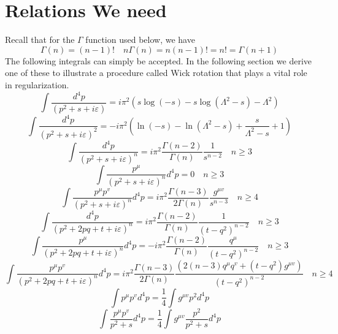 \section{Relations We need}
Recall that for the $\Gamma$ function used below, we have
$$\Gamma(n)=(n-1) !\quad n \Gamma(n)=n(n-1) !=n !=\Gamma(n+1)$$
The following integrals can simply be accepted. In the following section we derive one of these to illustrate a procedure called Wick rotation that plays a vital role in regularization.
\begin{equation}
\int \frac{d^{4} p}{\left(p^{2}+s+i \varepsilon\right)}=i \pi^{2}\left(s\log(-s)-s\log \left(\Lambda^{2}-s\right)-\Lambda^{2}\right)
\label{inttb-1}
\end{equation}
\begin{equation}
\int \frac{d^{4} p}{\left(p^{2}+s+i \varepsilon\right)^{2}}=-i \pi^{2}\left(\ln (-s)-\ln \left(\Lambda^{2}-s\right)+\frac{s}{\Lambda^{2}-s}+1\right)
\label{wick-test-int}
\end{equation}
\begin{equation}
\int \frac{d^{4} p}{\left(p^{2}+s+i \varepsilon\right)^{n}}=i \pi^{2} \frac{\Gamma(n-2)}{\Gamma(n)} \frac{1}{s^{n-2}}\quad n\geq 3
\label{inttb-3}
\end{equation}
\begin{equation}
\int \frac{p^{\mu}}{\left(p^{2}+s+i \varepsilon\right)^{n}} d^{4} p=0 \quad n \geq 3
\label{inttb-4}
\end{equation}
\begin{equation}
\int \frac{p^{\mu} p^{v}}{\left(p^{2}+s+i \varepsilon\right)^{n}} d^{4} p=i \pi^{2} \frac{\Gamma(n-3)}{2 \Gamma(n)} \frac{g^{\mu v}}{s^{n-3}} \quad n \geq 4
\label{inttb-5}
\end{equation}
\begin{equation}
\int \frac{d^{4} p}{\left(p^{2}+2 p q+t+i \varepsilon\right)^{n}}=i \pi^{2} \frac{\Gamma(n-2)}{\Gamma(n)} \frac{1}{\left(t-q^{2}\right)^{n-2}} \quad n \geq 3
\label{inttb-6}
\end{equation}
\begin{equation}\int \frac{p^{\mu}}{\left(p^{2}+2 p q+t+i \varepsilon\right)^{n}} d^{4} p=-i \pi^{2} \frac{\Gamma(n-2)}{\Gamma(n)} \frac{q^{\mu}}{\left(t-q^{2}\right)^{n-2}} \quad n \geq 3
\label{inttb-7}
\end{equation}
\begin{equation}
\int \frac{p^{\mu} p^{v}}{\left(p^{2}+2 p q+t+i \varepsilon\right)^{n}} d^{4} p=i \pi^{2} \frac{\Gamma(n-3)}{2 \Gamma(n)} \frac{\left(2(n-3) q^{\mu} q^{v}+\left(t-q^{2}\right) g^{\mu v}\right)}{\left(t-q^{2}\right)^{n-2}} \quad n \geq 4
\label{inttb-8}
\end{equation}
\begin{equation}
\int p^{\mu} p^{v} d^{4} p=\frac{1}{4} \int g^{\mu v} p^{2} d^{4} p
\label{inttb-9}
\end{equation}
\begin{equation}
\int \frac{p^{\mu} p^{v}}{p^{2}+s} d^{4} p=\frac{1}{4} \int g^{\mu v} \frac{p^{2}}{p^{2}+s} d^{4} p
\label{inttb-10}
\end{equation}
